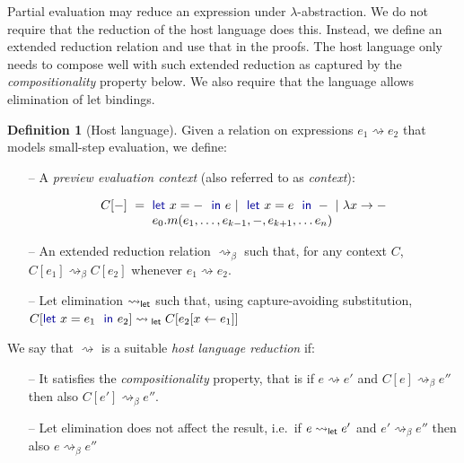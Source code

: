 \documentclass[sigplan,10pt,review,anonymous]{acmart}\settopmatter{printfolios=true,printccs=false,printacmref=false}
\newcounter{dfc}
\theoremstyle{plain}
\theoremstyle{definition}
\newtheorem{definition}[dfc]{Definition}
\newcommand{\ident}[1]{\textnormal{\sffamily #1}}
\newcommand{\kvd}[1]{\textnormal{\textcolor{kvdclr}{\sffamily #1}}}
\begin{document}
Partial evaluation may reduce an expression under $\lambda$-abstraction. We do not require that
the reduction of the host language does this. Instead, we define an extended reduction relation
and use that in the proofs. The host language only needs to compose well with such extended reduction
as captured by the \emph{compositionality} property below. We also require that the language allows
elimination of let bindings.

\begin{definition}[Host language]
\label{def:host}
Given a relation on expressions $e_1 \rightsquigarrow e_2$ that models small-step evaluation, we define:

\begin{itemize}
\item[--]  
 A \emph{preview evaluation context} (also referred to as \emph{context}):

\vspace{-1.25em}
\begin{equation*}
\begin{array}{lcl}
C[-] &\hspace{-1em}=\hspace{-1em}& \kvd{let}~x = -~\kvd{in}~e ~|~ \kvd{let}~x = e~\kvd{in}~- ~|~ \lambda x\rightarrow - \\
     &&  e_0.m(e_1, \ldots, e_{k-1}, -, e_{k+1}, \ldots e_n)
\end{array}
\end{equation*}

\item[--]  
An extended reduction relation $\rightsquigarrow_\beta$ such that, for any context $C$, 
$C[e_1] \rightsquigarrow_\beta C[e_2]$ whenever $e_1 \rightsquigarrow e_2$.

\item[--]  
Let elimination $\rightsquigarrow_\ident{let}$ such that, using  capture-avoiding substitution,
  $C[\kvd{let}~x=e_1~\kvd{in}~e_2] \rightsquigarrow_\ident{let} C[e_2[x\leftarrow e_1]]$
\end{itemize}

\noindent
We say that $\rightsquigarrow$ is a suitable \emph{host language reduction} if:
\begin{itemize}
\item[--] It satisfies the \emph{compositionality} property, that is if $e \rightsquigarrow e'$ and 
$C[e]\rightsquigarrow_\beta e''$ then also $C[e']\rightsquigarrow_\beta e''$.

\item[--] Let elimination does not affect the result, i.e.~if $e \rightsquigarrow_{\ident{let}} e'$ 
and $e'\rightsquigarrow_\beta e''$ then also $e\rightsquigarrow_\beta e''$ 
\end{itemize}
\end{definition}
\end{document}
